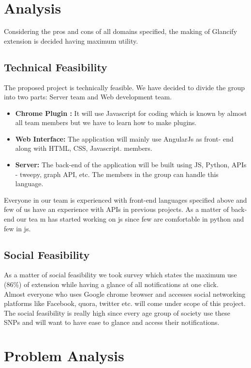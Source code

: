 \documentclass[12pt]{article}
\begin{document}
	\section{Analysis}
	Considering the pros and cons of all domains specified, the making of Glancify extension is decided having maximum utility.
	\subsection{Technical Feasibility}
	The proposed project is technically feasible. We have decided to divide the
group into two parts: Server team and Web development team.\\ 
	\begin{itemize}
	    \item \textbf{Chrome Plugin :} It will use Javascript for coding which is known by
almost all team members but we have to learn how to make plugins.
	\item \textbf{Web Interface:} The application will mainly use AngularJs as front- end
along with HTML, CSS, Javascript.
members.
	
	\item \textbf{Server:} The back-end of the application will be built using JS, Python, APIs - tweepy, graph API, etc. The members in the group can handle this
language.
    \end{itemize}
	
\hspace{10pt}	
	Everyone in our team is experienced with front-end languages specified above and few of us have an experience with APIs in previous projects. As a matter of back-end our tea
	m has started working on js since few are comfortable in python and few in js.
	
	\subsection{Social Feasibility}
	As a matter of social feasibility we took survey which states the maximum use (86\%) of extension while having a glance of all notifications at one click.\\Almost everyone who uses Google chrome  browser and accesses social networking platforms like Facebook, quora, twitter etc. will come under scope of this project.\\The social feasibility is really high since every age group of society use these SNPs and will want to have ease to glance and access their notifications.
	\section{Problem Analysis}
\end{document}
